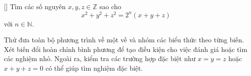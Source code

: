 \documentclass[../04-diophantine-equations.tex]{subfiles}
\begin{document}
\begin{exercise*}\label{example:ROU-2014-MO-G9-P1}[\textbf{}]
    Tìm các số nguyên \( x, y, z \in \mathbb{Z} \) sao cho
    \[
        x^2 + y^2 + z^2 = 2^n(x + y + z)
    \]
    với \( n \in \mathbb{N} \).
\end{exercise*}

\begin{remark*}
    Thử đưa toàn bộ phương trình về một vế và nhóm các biểu thức theo từng biến.
    Xét biến đổi hoàn chỉnh bình phương để tạo điều kiện cho việc đánh giá hoặc tìm các nghiệm nhỏ.
    Ngoài ra, kiểm tra các trường hợp đặc biệt như \( x = y = z \) hoặc \( x + y + z = 0 \) có thể giúp tìm nghiệm đặc biệt.
\end{remark*}

\end{document}
